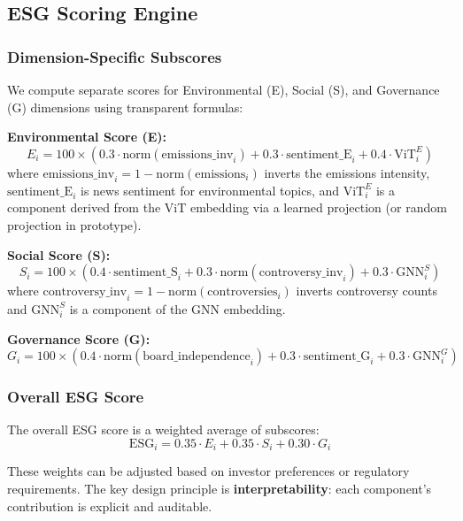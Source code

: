 \subsection{ESG Scoring Engine}

\subsubsection{Dimension-Specific Subscores}

We compute separate scores for Environmental (E), Social (S), and Governance (G) dimensions using transparent formulas:

\textbf{Environmental Score (E):}
\[
E_i = 100 \times \left(0.3 \cdot \text{norm}(\text{emissions\_inv}_i) + 0.3 \cdot \text{sentiment\_E}_i + 0.4 \cdot \text{ViT}_i^E\right)
\]
where $\text{emissions\_inv}_i = 1 - \text{norm}(\text{emissions}_i)$ inverts the emissions intensity, $\text{sentiment\_E}_i$ is news sentiment for environmental topics, and $\text{ViT}_i^E$ is a component derived from the ViT embedding via a learned projection (or random projection in prototype).

\textbf{Social Score (S):}
\[
S_i = 100 \times \left(0.4 \cdot \text{sentiment\_S}_i + 0.3 \cdot \text{norm}(\text{controversy\_inv}_i) + 0.3 \cdot \text{GNN}_i^S\right)
\]
where $\text{controversy\_inv}_i = 1 - \text{norm}(\text{controversies}_i)$ inverts controversy counts and $\text{GNN}_i^S$ is a component of the GNN embedding.

\textbf{Governance Score (G):}
\[
G_i = 100 \times \left(0.4 \cdot \text{norm}(\text{board\_independence}_i) + 0.3 \cdot \text{sentiment\_G}_i + 0.3 \cdot \text{GNN}_i^G\right)
\]

\subsubsection{Overall ESG Score}

The overall ESG score is a weighted average of subscores:
\[
\text{ESG}_i = 0.35 \cdot E_i + 0.35 \cdot S_i + 0.30 \cdot G_i
\]

These weights can be adjusted based on investor preferences or regulatory requirements. The key design principle is \textbf{interpretability}: each component's contribution is explicit and auditable.

